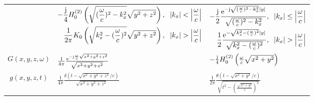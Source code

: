 \begin{table}[h!]
{\begin{tabular}[h!]{ @{}c | | l | l@{} }
    &      
    \scriptsize
    $\begin{aligned}[t] %
	-\frac{\ti}{4} H_0^{(2)}\left( \sqrt{(\frac{\omega}{c})^2 - k_x^2 } \sqrt{y^2+z^2} \right),\hspace{2mm} |k_x|<\left| \frac{\omega}{c} \right| \\ \frac{1}{2\pi} K_0\left( \sqrt{k_x^2 - (\frac{\omega}{c})^2 } \sqrt{y^2+z^2} \right),\hspace{2mm}  |k_x|>\left| \frac{\omega}{c} \right| 
	\end{aligned}$ \normalsize
     &     
     \scriptsize	$\begin{aligned}[t]
	-\frac{\ti}{2}\frac{\te^{-\ti\sqrt{(\frac{\omega}{c})^2 - k_x^2 }|y|}}{\sqrt{(\frac{\omega}{c})^2 - k_x^2 }},\hspace{2mm} |k_x|		\leq			\left| \frac{\omega}{c} \right| \\
	\frac{1}{2}\frac{\te^{- \sqrt{k_x^2 -(\frac{\omega}{c})^2}|y|}}{\sqrt{k_x^2 -(\frac{\omega}{c})^2}},\hspace{2mm}   |k_x|>\left| 					\frac{\omega}{c} \right| 
	\end{aligned}$ \normalsize      \\ 
    $G(x,y,z,\omega)$ 				 &  $\frac{1}{4\pi}\frac{\mathrm{e}^{-\mathrm{j}\frac{\omega}{c}\sqrt{x^2+y^2+z^2}}}{\sqrt{x^2+y^2+z^2}}$ & \scriptsize$-\frac{\mathrm{j}}{4} H_0^{(2)}\left( \frac{\omega}{c} \sqrt{x^2+y^2} \right) $\normalsize  \\ 
    $g(x,y,z,t)$ 					 &  $\frac{1}{4\pi}\frac{\delta\left( t - \sqrt{x^2+y^2+z^2}/c \right)}{\sqrt{x^2+y^2+z^2}}$  & $\frac{1}{2\pi}\frac{\theta(t - \sqrt{x^2+y^2}/c)}{\sqrt{t^2 - \left(\frac{\sqrt{x^2+y^2}}{c}\right)^2}}$
    \end{tabular}}
\end{table}
\FloatBarrier

